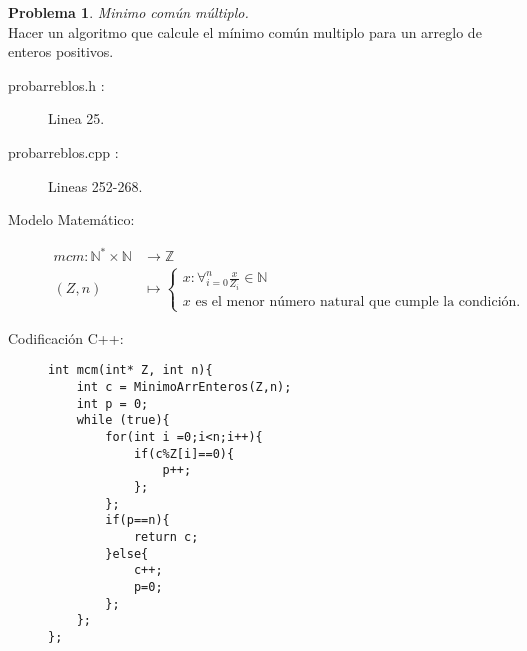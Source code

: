 \documentclass{article}
\theoremstyle{plain}
\theoremstyle{definition}
\newtheorem{problem}{Problema}
\begin{document}
\begin{problem} \emph{Minimo común múltiplo.}\\
\hspace*{7mm}Hacer un algoritmo que calcule el mínimo común multiplo para un arreglo de enteros positivos.
\begin{description}
\item[probarreblos.h :] Linea 25. \item[probarreblos.cpp :] Lineas 252-268.

\item[Modelo Matemático:]
\begin{align*}
mcm: \mathbb{N}^{*}\times\mathbb{N} &\to \mathbb{Z}\\
(Z,n) &\mapsto
\begin{cases}
x:\forall_{i=0}^{n} \frac{x}{Z_{i}}\in \mathbb{N}\\
\text{$x$ es el menor número natural que cumple la condición.}
\end{cases}
\end{align*}
%
\item[Codificación \textsf{C++}:]\hfill
%
\begin{verbatim}
int mcm(int* Z, int n){
    int c = MinimoArrEnteros(Z,n);
    int p = 0;
    while (true){
        for(int i =0;i<n;i++){
            if(c%Z[i]==0){
                p++;
            };
        };
        if(p==n){
            return c;
        }else{
            c++;
            p=0;
        };
    };
};
\end{verbatim}
\end{description}
\end{problem}
\end{document}
